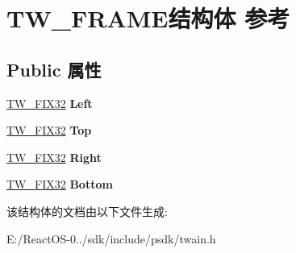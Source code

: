 \hypertarget{struct_t_w___f_r_a_m_e}{}\section{T\+W\+\_\+\+F\+R\+A\+M\+E结构体 参考}
\label{struct_t_w___f_r_a_m_e}
\subsection*{Public 属性}
\begin{DoxyCompactItemize}
\item 
\mbox{\label{struct_t_w___f_r_a_m_e_a4bb4a26a7dd681576d23bace92033fe2}} 
\hyperlink{struct_t_w___f_i_x32}{T\+W\+\_\+\+F\+I\+X32} {\bfseries Left}
\item 
\mbox{\label{struct_t_w___f_r_a_m_e_af285b902fc5b2c245d88724186df30f5}} 
\hyperlink{struct_t_w___f_i_x32}{T\+W\+\_\+\+F\+I\+X32} {\bfseries Top}
\item 
\mbox{\label{struct_t_w___f_r_a_m_e_aead98d4789701405e160a45948123b04}} 
\hyperlink{struct_t_w___f_i_x32}{T\+W\+\_\+\+F\+I\+X32} {\bfseries Right}
\item 
\mbox{\label{struct_t_w___f_r_a_m_e_a30e7b72360d1231633f99d5fbf5974aa}} 
\hyperlink{struct_t_w___f_i_x32}{T\+W\+\_\+\+F\+I\+X32} {\bfseries Bottom}
\end{DoxyCompactItemize}


该结构体的文档由以下文件生成\+:\begin{DoxyCompactItemize}
\item 
E\+:/\+React\+O\+S-\/0../sdk/include/psdk/twain.\+h\end{DoxyCompactItemize}
